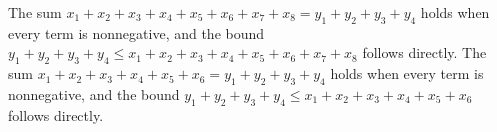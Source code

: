 \documentclass{article}
\begin{document}
The sum $x_{1} + x_{2} + x_{3} + x_{4} + x_{5} + x_{6} + x_{7} + x_{8} = y_{1} + y_{2} + y_{3} + y_{4}$ holds when every term is nonnegative, and the bound $y_{1} + y_{2} + y_{3} + y_{4} \le x_{1} + x_{2} + x_{3} + x_{4} + x_{5} + x_{6} + x_{7} + x_{8}$ follows directly.
The sum $x_{1} + x_{2} + x_{3} + x_{4} + x_{5} + x_{6} = y_{1} + y_{2} + y_{3} + y_{4}$ holds when every term is nonnegative, and the bound $y_{1} + y_{2} + y_{3} + y_{4} \le x_{1} + x_{2} + x_{3} + x_{4} + x_{5} + x_{6}$ follows directly.
\end{document}
